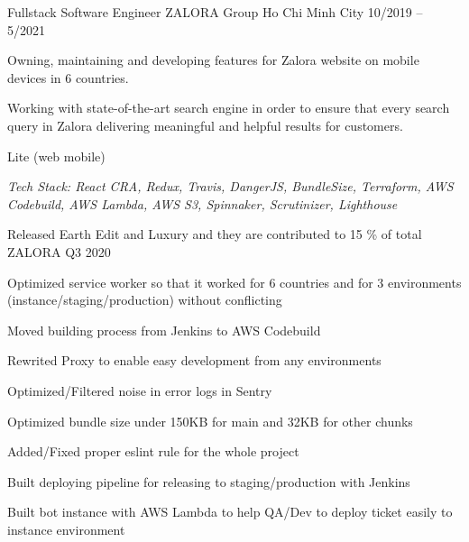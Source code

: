 \begin{cventries}
  \cventry
    {Fullstack Software Engineer} %
    {ZALORA Group} %
    {Ho Chi Minh City} %
    {10/2019 -- 5/2021} %
    {
      \begin{cvitems} %
        \item {Owning, maintaining and developing features for Zalora website on mobile devices in 6 countries.}
        \item {Working with state-of-the-art search engine in order to ensure that every search query in Zalora delivering meaningful and helpful results for customers.}
      \end{cvitems}
    }
     \cventry
    {Lite (web mobile)} %
    {} %
    {} %
    {} %
    {
      \begin{cvitems} %
         \item[] {\it Tech Stack: React CRA, Redux, Travis, DangerJS, BundleSize, Terraform, AWS Codebuild, AWS Lambda, AWS S3, Spinnaker, Scrutinizer, Lighthouse}
        \item {Released Earth Edit and Luxury and they are contributed to 15 \% of total ZALORA Q3 2020}
        \item {Optimized service worker so that it worked for 6 countries and for 3 environments (instance/staging/production) without conflicting}
        \item {Moved building process from Jenkins to AWS Codebuild}
        \item {Rewrited Proxy to enable easy development from any environments}
        \item {Optimized/Filtered noise in error logs in Sentry}
        \item {Optimized bundle size under 150KB for main and 32KB for other chunks}
        \item {Added/Fixed proper eslint rule for the whole project}
        \item{Built deploying pipeline for releasing to staging/production with Jenkins}
        \item {Built bot instance with AWS Lambda to help QA/Dev to deploy ticket easily to instance environment}
      \end{cvitems}
    }
    

\end{cventries}
